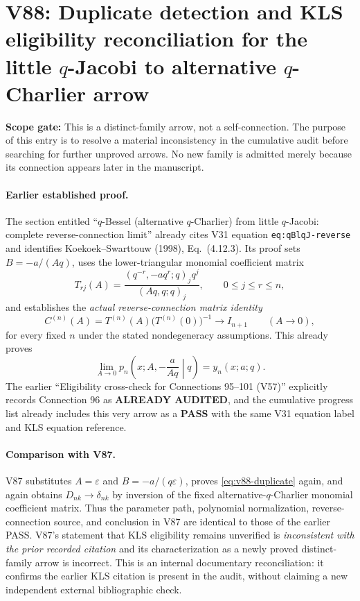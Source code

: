 \documentclass[11pt]{article}
\begin{document}
\section{V88: Duplicate detection and KLS eligibility reconciliation for the little $q$-Jacobi to alternative $q$-Charlier arrow}
\noindent\textbf{Scope gate:} This is a distinct-family arrow, not a self-connection. The purpose of this entry is to resolve a material inconsistency in the cumulative audit before searching for further unproved arrows. No new family is admitted merely because its connection appears later in the manuscript.

\paragraph{Earlier established proof.}
The section entitled ``$q$-Bessel (alternative $q$-Charlier) from little $q$-Jacobi: complete reverse-connection limit'' already cites V31 equation \texttt{eq:qBlqJ-reverse} and identifies Koekoek--Swarttouw (1998), Eq.~(4.12.3). Its proof sets $B=-a/(Aq)$, uses the lower-triangular monomial coefficient matrix
\[
 T_{rj}(A)=\frac{(q^{-r},-aq^r;q)_j q^j}{(Aq,q;q)_j},\qquad 0\le j\le r\le n,
\]
and establishes the \emph{actual reverse-connection matrix identity}
\[
 C^{(n)}(A)=T^{(n)}(A)\bigl(T^{(n)}(0)\bigr)^{-1}
 \longrightarrow I_{n+1}\qquad(A\to0),
\]
for every fixed $n$ under the stated nondegeneracy assumptions. This already proves
\begin{equation}\label{eq:v88-duplicate}
 \lim_{A\to0}p_n\left(x;A,-\frac{a}{Aq}\middle|q\right)=y_n(x;a;q).
\end{equation}
The earlier ``Eligibility cross-check for Connections 95--101 (V57)'' explicitly records Connection 96 as \textbf{ALREADY AUDITED}, and the cumulative progress list already includes this very arrow as a \textbf{PASS} with the same V31 equation label and KLS equation reference.

\paragraph{Comparison with V87.}
V87 substitutes $A=\varepsilon$ and $B=-a/(q\varepsilon)$, proves \eqref{eq:v88-duplicate} again, and again obtains $D_{nk}\to\delta_{nk}$ by inversion of the fixed alternative-$q$-Charlier monomial coefficient matrix. Thus the parameter path, polynomial normalization, reverse-connection source, and conclusion in V87 are identical to those of the earlier PASS. V87's statement that KLS eligibility remains unverified is \emph{inconsistent with the prior recorded citation} and its characterization as a newly proved distinct-family arrow is incorrect. This is an internal documentary reconciliation: it confirms the earlier KLS citation is present in the audit, without claiming a new independent external bibliographic check.
\end{document}
